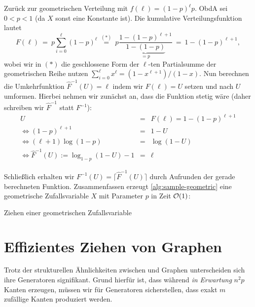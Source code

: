 Zurück  zur geometrischen Verteilung mit $f(\ell) = (1-p)^\ell p$.
ObdA sei $0 < p < 1$ (da $X$ sonst eine Konstante ist).
Die kumulative Verteilungsfunktion lautet
\begin{equation}
    F(\ell)
    \ =\ p \sum_{i=0}^\ell (1-p)^\ell
    \ \stackrel{(*)}{=} \ p \frac{1 - (1-p)^{\ell+1}}{\underbrace{1 - (1-p)}_{=p}}
    \ = \ 1 - (1-p)^{\ell+1},
\end{equation}
wobei wir in $(*)$ die geschlossene Form der $\ell$-ten Partialsumme der geometrischen Reihe nutzen $\sum_{i=0}^\ell x^\ell = (1 - x^{\ell+1})/(1 - x)$.
Nun berechnen die Umkehrfunktion $\hat F^{-1}(U) = \ell$ indem wir $F(\ell) = U$ setzen und nach $U$ umformen.
Hierbei nehmen wir zunächst an, dass die Funktion stetig wäre (daher schreiben wir $\hat F ^{-1}$ statt $F^{-1}$):
\begin{eqnarray}
    U &=& F(\ell) = 1 - (1-p)^{\ell+1} \\
    \Leftrightarrow (1-p)^{\ell+1} &=& 1 - U \\
    \Leftrightarrow  (\ell+1) \log(1-p)  &=& \log(1 - U) \\
    \Leftrightarrow  \hat F^{-1}(U) := \log_{1-p}(1 - U) - 1 &=& \ell \label{eq:inverse-hat}
\end{eqnarray}

Schließlich erhalten wir $F^{-1}(U) = \lceil \hat F^{-1} (U) \rceil$ durch Aufrunden der gerade berechneten Funktion.
Zusammenfassen erzeugt \cref{alg:sample-geometric} eine geometrische Zufallsvariable $X$ mit Parameter $p$ in Zeit $\mathcal{O}\!\left(1\right)$:

\begin{algorithm}[H]
    \Else{$U \gets \text{ziehen uniform aus $[0, 1)$}$\;
    Gebe $\lceil \log_{1-p}(1 - U) - 1\rceil$ zurück.}
    \caption{Ziehen einer geometrischen Zufallsvariable}
    \label{alg:sample-geometric}
\end{algorithm}

\bigskip
\bigskip

\section{Effizientes Ziehen von \Gnm Graphen}
Trotz der strukturellen Ähnlichkeiten zwischen \Gnp und \Gnm Graphen unterscheiden sich ihre Generatoren signifikant.
Grund hierfür ist, dass während \Gnp \emph{in Erwartung} $n^2p$ Kanten erzeugen, müssen wir für \Gnm Generatoren sicherstellen, dass exakt $m$ zufällige Kanten produziert werden.

